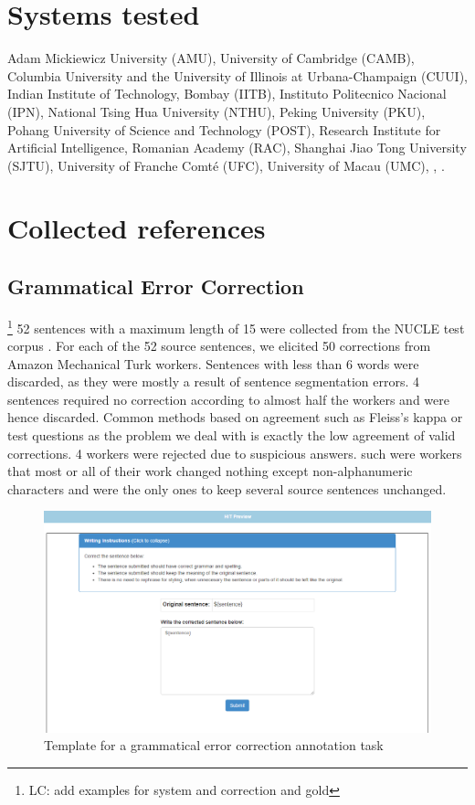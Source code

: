 \documentclass[letterpaper, 11pt]{article}
\newcommand{\lc}[1]{\footnote{\color{blue}LC: #1}}
\begin{document}
\section{Systems tested}\label{ap:abbr}
 Adam Mickiewicz University (AMU),
 University of Cambridge (CAMB), Columbia University and the University of Illinois at Urbana-Champaign (CUUI),
 Indian Institute of Technology, Bombay (IITB), Instituto Politecnico Nacional (IPN),
 National Tsing Hua University (NTHU), Peking University (PKU), Pohang University of Science and Technology (POST),
 Research Institute for Artificial Intelligence, Romanian Academy (RAC), Shanghai Jiao Tong University (SJTU),
 University of Franche Comt\'{e} (UFC), University of Macau (UMC), ,  .

\section{Collected references}\label{ap:crowd}
\subsection{Grammatical Error Correction}
\lc{add examples for system and correction and gold}
52 sentences with a maximum length of 15 were collected from the NUCLE test corpus \cite{dahlmeier2013building}. 
For each of the 52 source sentences, 
we elicited 50 corrections from Amazon Mechanical Turk workers.
Sentences with less than 6 words were discarded, as they were mostly a result of sentence segmentation errors.
4 sentences required no correction according to almost half the workers and were hence discarded.
Common methods based on agreement such as Fleiss's kappa or test questions as the problem we deal with is exactly the low agreement of valid corrections.
4 workers were rejected due to suspicious answers. such were workers that most or all of their work changed nothing except non-alphanumeric characters and were the only ones to keep several source sentences unchanged. 

\begin{figure}[htb]
	\includegraphics[width=0.9\columnwidth]{correction_task}
	\caption{Template for a grammatical error correction annotation task} 
\end{figure}
\end{document}
